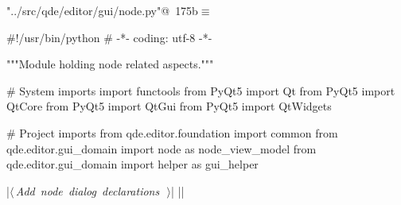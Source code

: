 \documentclass[%
    a4paper,    %
    justified,  %
    nobib,      %
    openany     %
]{tufte-book}
\begin{document}
\begin{flushleft} \small
\begin{minipage}{\linewidth}\label{scrap202}\raggedright\small
{} \verb@"../src/qde/editor/gui/node.py"@\nobreak\ {\footnotesize {175b}}$\equiv$
\vspace{-1ex}
\begin{pythoncode}
#!/usr/bin/python
# -*- coding: utf-8 -*-

"""Module holding node related aspects."""

# System imports
import functools
from PyQt5 import Qt
from PyQt5 import QtCore
from PyQt5 import QtGui
from PyQt5 import QtWidgets

# Project imports
from qde.editor.foundation import common
from qde.editor.gui_domain import node   as node_view_model
from qde.editor.gui_domain import helper as gui_helper


|\hbox{$\langle\,${\itshape Add node dialog declarations}\nobreak\ {\footnotesize {}}$\,\rangle$}|
|\NWsep|
\end{pythoncode}
\vspace{1.5ex}
\footnotesize
\begin{list}{}{\setlength{\itemsep}{-\parsep}\setlength{\itemindent}{-\leftmargin}}

\item{}
\end{list}
\end{minipage}\vspace{4ex}
\end{flushleft}
\end{document}

